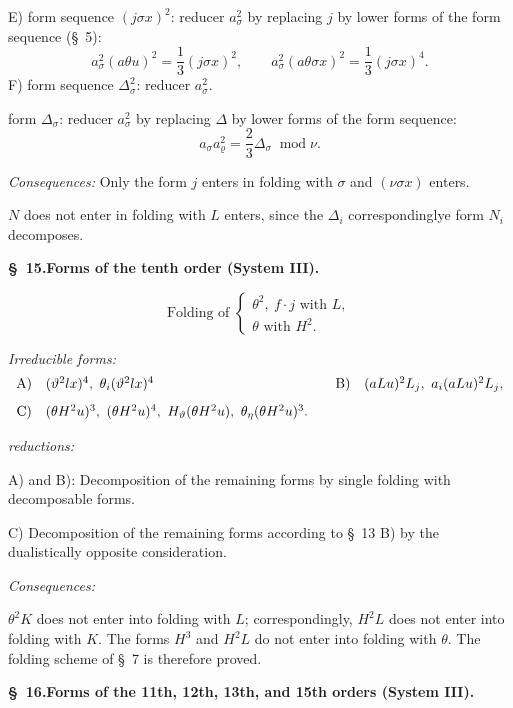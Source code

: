 \documentclass[11pt]{article}
\newcommand{\A}{\Delta}
\newcommand{\R}{\varrho}
\newcommand{\modu}[1]{\;\operatorname{mod} #1}
\begin{document}
E) form sequence $(j\sigma x)^2$: reducer $a_\sigma^2$ by replacing $j$ by lower forms of the form sequence (\S\ 5):
\[
a_\sigma^2(a\theta u)^2=\frac13(j\sigma x)^2,
\qquad
a_\sigma^2(a\theta\sigma x)^2=\frac13(j\sigma x)^4.
\]
F) form sequence $\A_\sigma^2$: reducer $a_\sigma^2$.

form $\A_\sigma$: reducer $a_\sigma^2$ by replacing $\A$ by lower forms of the form sequence:
\[
a_\sigma a_\R^2=\frac23\A_\sigma\modu{\nu}.
\]

\noindent\emph{Consequences:} Only the form $j$ enters in folding with $\sigma$ and $(\nu\sigma x)$ enters.

$N$ does not enter in folding with $L$ enters, since the $\A_i$ correspondinglye form $N_i$ decomposes.

\begin{center}
\textbf{\S\ 15.\quad Forms of the tenth order (System III).}
\end{center}
\[
\text{Folding of }\left\{\begin{array}{l}
\theta^2,
\ f\cdot j\text{ with }L,\\
\theta\text{ with }H^2.
\end{array}\right.
\]

\noindent\emph{Irreducible forms:}
\[
\begin{array}{c@{\quad}l@{\qquad}c@{\quad}l}
\text{A)}&(\vartheta^2lx)^4,
\ \theta_i(\vartheta^2lx)^4&
\text{B)}&(aLu)^2L_j,
\ a_i(aLu)^2L_j,\\[0.8em]
\text{C)}&(\theta H^2u)^3,
\ (\theta H^2u)^4,
\ H_\vartheta(\theta H^2u),
\ \theta_\eta(\theta H^2u)^3.
\end{array}
\]

\noindent\emph{reductions:}

A) and B): Decomposition of the remaining forms by single folding with decomposable forms.

C) Decomposition of the remaining forms according to \S\ 13 B) by the dualistically opposite consideration.

\noindent\emph{Consequences:}

$\theta^2K$ does not enter into folding with $L$; correspondingly, $H^2L$ does not enter into folding with $K$. The forms $H^3$ and $H^2L$ do not enter into folding with $\theta$. The folding scheme of \S\ 7 is therefore proved.

\begin{center}
\textbf{\S\ 16.\quad Forms of the 11th, 12th, 13th, and 15th orders (System III).}
\end{center}
\end{document}
